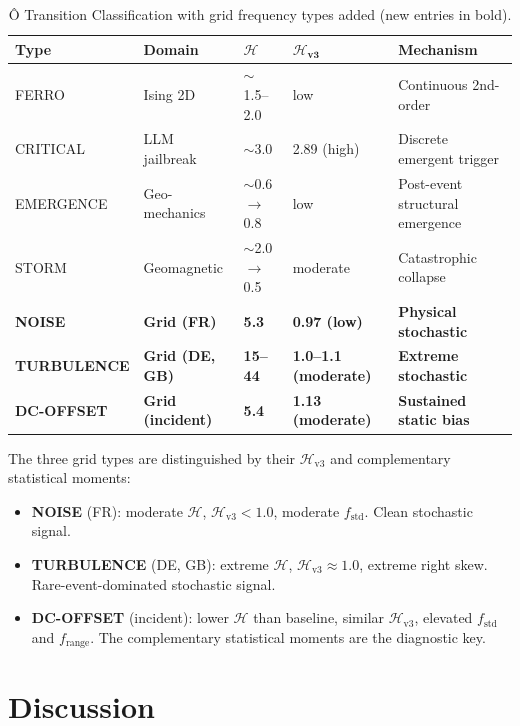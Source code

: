 \documentclass[11pt,a4paper]{article}
\begin{document}
\begin{table}[H]
\centering
\caption{Ô Transition Classification with grid frequency types added (new entries in bold).}
\label{tab:transition_types}
\begin{tabular}{lllll}
\toprule
\textbf{Type} & \textbf{Domain} & $\boldsymbol{\mathcal{H}}$ & $\boldsymbol{\mathcal{H}_{\text{v3}}}$ & \textbf{Mechanism} \\
\midrule
FERRO & Ising 2D & $\sim$1.5--2.0 & low & Continuous 2nd-order \\
CRITICAL & LLM jailbreak & $\sim$3.0 & 2.89 (high) & Discrete emergent trigger \\
EMERGENCE & Geo-mechanics & $\sim$0.6$\rightarrow$0.8 & low & Post-event structural emergence \\
STORM & Geomagnetic & $\sim$2.0$\rightarrow$0.5 & moderate & Catastrophic collapse \\
\textbf{NOISE} & \textbf{Grid (FR)} & \textbf{5.3} & \textbf{0.97 (low)} & \textbf{Physical stochastic} \\
\textbf{TURBULENCE} & \textbf{Grid (DE, GB)} & \textbf{15--44} & \textbf{1.0--1.1 (moderate)} & \textbf{Extreme stochastic} \\
\textbf{DC-OFFSET} & \textbf{Grid (incident)} & \textbf{5.4} & \textbf{1.13 (moderate)} & \textbf{Sustained static bias} \\
\bottomrule
\end{tabular}
\end{table}

The three grid types are distinguished by their $\mathcal{H}_{\text{v3}}$ and complementary statistical moments:
\begin{itemize}
    \item \textbf{NOISE} (FR): moderate $\mathcal{H}$, $\mathcal{H}_{\text{v3}} < 1.0$, moderate $f_{\text{std}}$. Clean stochastic signal.
    \item \textbf{TURBULENCE} (DE, GB): extreme $\mathcal{H}$, $\mathcal{H}_{\text{v3}} \approx 1.0$, extreme right skew. Rare-event-dominated stochastic signal.
    \item \textbf{DC-OFFSET} (incident): lower $\mathcal{H}$ than baseline, similar $\mathcal{H}_{\text{v3}}$, elevated $f_{\text{std}}$ and $f_{\text{range}}$. The complementary statistical moments are the diagnostic key.
\end{itemize}

\section{Discussion}
\end{document}
